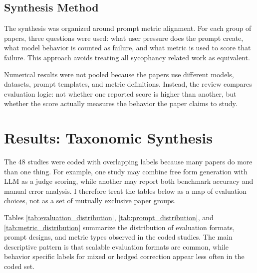 \documentclass[letterpaper]{article} %
\begin{document}
\subsection{Synthesis Method}

The synthesis was organized around prompt metric alignment. For each group of papers, three questions were used: what user pressure does the prompt create, what model behavior is counted as failure, and what metric is used to score that failure. This approach avoids treating all sycophancy related work as equivalent.

Numerical results were not pooled because the papers use different models, datasets, prompt templates, and metric definitions. Instead, the review compares evaluation logic: not whether one reported score is higher than another, but whether the score actually measures the behavior the paper claims to study.

\section{Results: Taxonomic Synthesis}

The 48 studies were coded with overlapping labels because many papers do more than one thing. For example, one study may combine free form generation with LLM as a judge scoring, while another may report both benchmark accuracy and manual error analysis. I therefore treat the tables below as a map of evaluation choices, not as a set of mutually exclusive paper groups.

Tables \ref{tab:evaluation_distribution}, \ref{tab:prompt_distribution}, and \ref{tab:metric_distribution} summarize the distribution of evaluation formats, prompt designs, and metric types observed in the coded studies. The main descriptive pattern is that scalable evaluation formats are common, while behavior specific labels for mixed or hedged correction appear less often in the coded set.

\begin{table}[t]
\centering
\caption{Distribution of evaluation formats among the 48 included studies. Categories are not mutually exclusive.}
\label{tab:evaluation_distribution}
\renewcommand{\arraystretch}{1.15}
\end{table}
\end{document}

